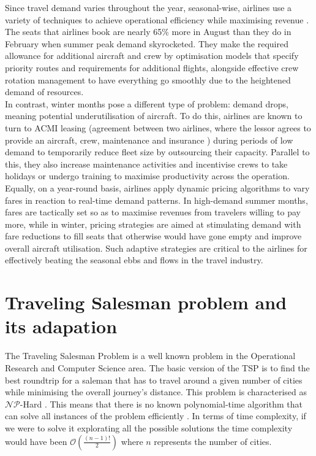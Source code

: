 Since travel demand varies throughout the year, seasonal-wise, airlines use a variety of techniques to achieve operational efficiency while maximising revenue \cite{flight_seasonnality_challenges}. The seats that airlines book are nearly 65\% more in August than they do in February when summer peak demand skyrocketed. They make the required allowance for additional aircraft and crew by optimisation models that specify priority routes and requirements for additional flights, alongside effective crew rotation management to have everything go smoothly due to the heightened demand of resources.
\\In contrast, winter months pose a different type of problem: demand drops, meaning potential underutilisation of aircraft. To do this, airlines are known to turn to ACMI leasing (agreement between two airlines, where the lessor agrees to provide an aircraft, crew, maintenance and insurance \cite{acmi_def}) during periods of low demand to temporarily reduce fleet size by outsourcing their capacity. Parallel to this, they also increase maintenance activities and incentivise crews to take holidays or undergo training to maximise productivity across the operation. Equally, on a year-round basis, airlines apply dynamic pricing algorithms to vary fares in reaction to real-time demand patterns. In high-demand summer months, fares are tactically set so as to maximise revenues from travelers willing to pay more, while in winter, pricing strategies are aimed at stimulating demand with fare reductions to fill seats that otherwise would have gone empty and improve overall aircraft utilisation. Such adaptive strategies are critical to the airlines for effectively beating the seasonal ebbs and flows in the travel industry.




\newpage
\section{Traveling Salesman problem and its adapation}
\label{sec:TSP}

The Traveling Salesman Problem is a well known problem in the Operational Research and Computer Science area. The basic version of the TSP is to find the best roundtrip for a saleman that has to travel around a given number of cities while minimising the overall journey's distance.
This problem is characterised as $\mathcal{NP}$-Hard \cite{np_hardness}. This means that there is no known polynomial-time algorithm that can solve all instances of the problem efficiently . In terms of time complexity, if we were to solve it explorating all the possible solutions the time complexity would have been $\mathcal{O}(\frac{(n-1)!}{2})$ where $n$ represents the number of cities.

